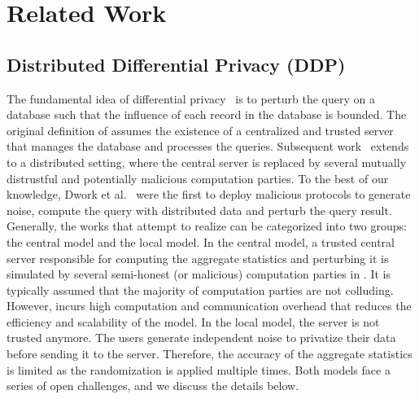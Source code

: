 \chapter{Related Work}
\label{cha:RelatedWork}

\section{Distributed Differential Privacy (DDP)}
\label{sec:DistributedDifferentialPrivacy}

The fundamental idea of differential privacy~\cite{dwork2006differential} is to perturb the query on a database such that the influence of each record in the database is bounded. The original definition of \differentialprivacy assumes the existence of a centralized and trusted server that manages the database and processes the queries. Subsequent work~\cite{dwork2006our} extends \differentialprivacy to a distributed setting, where the central server is replaced by several mutually distrustful and potentially malicious computation parties. To the best of our knowledge, Dwork et al.~\cite{dwork2006our} were the first to deploy malicious \smpc protocols to generate noise, compute the query with distributed data and perturb the query result. Generally, the works that attempt to realize \ddp can be categorized into two groups: the central \differentialprivacy model and the local \differentialprivacy model.
In the central \differentialprivacy model, a trusted central server responsible for computing the aggregate statistics and perturbing it is simulated by several semi-honest (or malicious) computation parties in \smpc. It is typically assumed that the majority of computation parties are not colluding. However, \smpc incurs high computation and communication overhead that reduces the efficiency and scalability of the model.
In the local \differentialprivacy model, the server is not trusted anymore. The users generate independent noise to privatize their data before sending it to the server. Therefore, the accuracy of the aggregate statistics is limited as the randomization is applied multiple times. Both models face a series of open challenges, and we discuss the details below.

